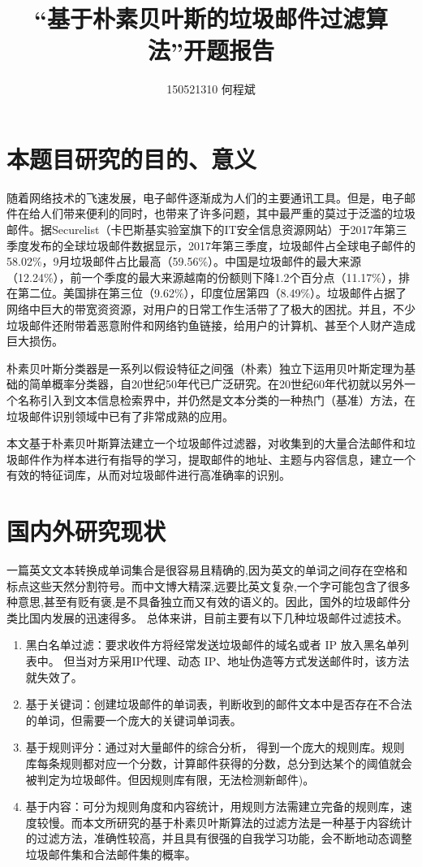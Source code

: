 \documentclass[UTF8]{ctexart}
\title{“基于朴素贝叶斯的垃圾邮件过滤算法”开题报告}
\author{150521310 何程斌}
\date{}
\begin{document}
\maketitle

\section{本题目研究的目的、意义}
随着网络技术的飞速发展，电子邮件逐渐成为人们的主要通讯工具。但是，电子邮件在给人们带来便利的同时，也带来了许多问题，其中最严重的莫过于泛滥的垃圾邮件。据Securelist（卡巴斯基实验室旗下的IT安全信息资源网站）于2017年第三季度发布的全球垃圾邮件数据显示，2017年第三季度，垃圾邮件占全球电子邮件的58.02\%，9月垃圾邮件占比最高（59.56\%）。中国是垃圾邮件的最大来源（12.24\%），前一个季度的最大来源越南的份额则下降1.2个百分点（11.17\%），排在第二位。美国排在第三位（9.62\%），印度位居第四（8.49\%）。垃圾邮件占据了网络中巨大的带宽资资源，对用户的日常工作生活带了了极大的困扰。并且，不少垃圾邮件还附带着恶意附件和网络钓鱼链接，给用户的计算机、甚至个人财产造成巨大损伤。

朴素贝叶斯分类器是一系列以假设特征之间强（朴素）独立下运用贝叶斯定理为基础的简单概率分类器，自20世纪50年代已广泛研究。在20世纪60年代初就以另外一个名称引入到文本信息检索界中\cite{ref1}，并仍然是文本分类的一种热门（基准）方法，在垃圾邮件识别领域中已有了非常成熟的应用。

本文基于朴素贝叶斯算法建立一个垃圾邮件过滤器，对收集到的大量合法邮件和垃圾邮件作为样本进行有指导的学习，提取邮件的地址、主题与内容信息，建立一个有效的特征词库，从而对垃圾邮件进行高准确率的识别。


\section{国内外研究现状}
一篇英文文本转换成单词集合是很容易且精确的,因为英文的单词之间存在空格和标点这些天然分割符号。而中文博大精深,远要比英文复杂,一个字可能包含了很多种意思,甚至有贬有褒,是不具备独立而又有效的语义的。因此，国外的垃圾邮件分类比国内发展的迅速得多。
总体来讲，目前主要有以下几种垃圾邮件过滤技术。
\begin{enumerate}
\item 黑白名单过滤：要求收件方将经常发送垃圾邮件的域名或者 IP 放入黑名单列表中。
但当对方采用IP代理、动态 IP、地址伪造等方式发送邮件时，该方法就失效了\cite{ref2}。
\item 基于关键词：创建垃圾邮件的单词表，判断收到的邮件文本中是否存在不合法的单词，但需要一个庞大的关键词单词表\cite{ref3}。
\item 基于规则评分：通过对大量邮件的综合分析， 得到一个庞大的规则库。规则库每条规则都对应一个分数，计算邮件获得的分数，总分到达某个的阈值就会被判定为垃圾邮件。但因规则库有限，无法检测新邮件\cite{ref3})。
\item 基于内容：可分为规则角度和内容统计，用规则方法需建立完备的规则库，速度较慢。而本文所研究的基于朴素贝叶斯算法的过滤方法是一种基于内容统计的过滤方法，准确性较高\cite{ref3}，并且具有很强的自我学习功能，会不断地动态调整垃圾邮件集和合法邮件集的概率。
\end{enumerate}
\end{document}
